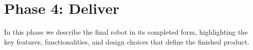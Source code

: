 \section{Phase 4: Deliver}

In this phase we describe the final robot in its completed form, highlighting the key features, functionalities, and design choices that define the finished product.
